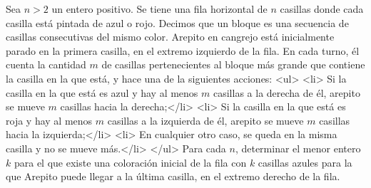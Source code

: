 Sea $n\gt 2$ un entero positivo. Se tiene una fila horizontal de $n$ casillas donde cada casilla está pintada de azul o rojo. Decimos que un bloque es una secuencia de casillas consecutivas del mismo color. Arepito en cangrejo está inicialmente parado en la primera casilla, en el extremo izquierdo de la fila. En cada turno, él cuenta la cantidad $m$ de casillas pertenecientes al bloque más grande que contiene la casilla en la que está, y hace una de la siguientes acciones:
<ul>
<li> Si la casilla en la que está es azul y hay al menos $m$ casillas a la derecha de él, arepito se mueve $m$ casillas hacia la derecha;</li>
<li> Si la casilla en la que está es roja y hay al menos $m$ casillas a la izquierda de él, arepito se mueve $m$ casillas hacia la izquierda;</li>
<li> En cualquier otro caso, se queda en la misma casilla y no se mueve más.</li>
</ul>
Para cada $n$, determinar el menor entero $k$ para el que existe una coloración inicial de la fila con $k$ casillas azules para la que Arepito puede llegar a la última casilla, en el extremo derecho de la fila.